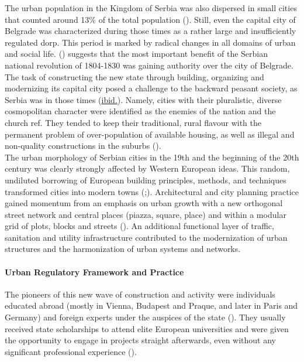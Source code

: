 \documentclass[11pt]{report}
\begin{document}
The  urban  population  in  the  Kingdom  of  Serbia  was  also dispersed  in  small  cities that counted around 13\% of the total population (\href{Kraljevina Jugoslavija}{\citealt{drzavna_statistika_kraljevine_jugoslavije_definitivni_1932}}). Still, even the capital city of Belgrade was characterized during those times as a rather large and insufficiently regulated dorp.  This period is marked by radical changes in all domains of urban and social life.
(\href{Samardzic}{\citealt{doytchinov_belgrade_2015}}) suggests that the most important benefit of the Serbian national revolution of 1804-1830 was gaining authority over the city of Belgrade. The task of constructing the new state through building, organizing and modernizing its capital city posed a challenge to the backward peasant society, as Serbia was in those times  (\href{Samardzic}{ibid.}). Namely, cities with their pluralistic, diverse cosmopolitan character were identified as the enemies of the nation and the church ref. They tended to keep their traditional, rural flavour with the permanent problem of over-population of available housing, as well as illegal and non-quality constructions in the suburbs (\href{Doytchinov}{\citealt{doytchinov_modernization_2015}}).
\\  

The urban morphology of Serbian cities in the 19th and the beginning of the 20th century was clearly strongly affected by Western European ideas. This random, undiluted borrowing of European building principles, methods, and techniques transformed cities into modern towns  (\href{Nedovic}{\citealt{nedovicbudic_waves_2006}};\href{Kadijevic}{\citealt{kadijevic_jedan_2007}}). Architectural and city planning practice gained momentum from an emphasis on urban growth with a new orthogonal street network and central places (piazza, square, place) and within a modular grid of plots, blocks and streets (\href{Kadijevic}{\citealt{kadijevic_jedan_2007}}). An additional functional layer of traffic, sanitation and utility infrastructure contributed to the modernization of urban structures and the harmonization of urban systems and networks.

\paragraph{Urban Regulatory Framework and Practice}

The pioneers of this new wave of construction and activity were individuals educated abroad (mostly in Vienna, Budapest and Praque, and later in Paris and Germany) and foreign experts under the auspices of the state (\href{Maksimovic}{\citealt{maksimovic_idejni_1978}}). They usually received state scholarships to attend elite European universities and were given the opportunity to engage in projects straight afterwards, even without any significant professional experience (\href{Mladjenovic}{\citealt{mladjenovic_novija_2010}}).
\\
\end{document}
